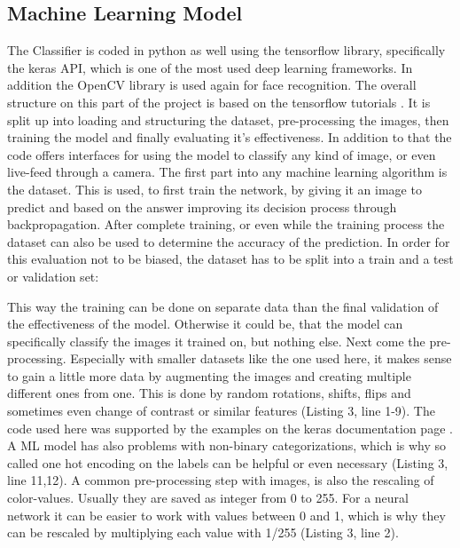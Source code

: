 \subsection{Machine Learning Model}

The Classifier is coded in python as well using the tensorflow library,
specifically the keras API, which is one of the most used deep learning
frameworks. In addition the OpenCV library is used again for face recognition. 
\newline
The overall structure on this part of the project is based on the tensorflow
tutorials \cite{tut}. It is split up into loading and structuring the dataset,
pre-processing the images, then training the model and finally evaluating it's
effectiveness. In addition to that the code offers interfaces for using the
model to classify any kind of image, or even live-feed through a camera.
\newline
The first part into any machine learning algorithm is the dataset. This is used,
to first train the network, by giving it an image to predict and based on the
answer improving its decision process through backpropagation. After complete
training, or even while the training process the dataset can also be used to
determine the accuracy of the prediction. In order for this evaluation not to be
biased, the dataset has to be split into a train and a test or validation set:

This way the training can be done on separate data than the final validation of
the effectiveness of the model. Otherwise it could be, that the model can
specifically classify the images it trained on, but nothing else.
\newline
Next come the pre-processing. Especially with smaller datasets like the one used
here, it makes sense to gain a little more data by augmenting the images and
creating multiple different ones from one. This is done by random rotations,
shifts, flips and sometimes even change of contrast or similar features (Listing
3, line 1-9). The code used here was supported by the examples on the keras
documentation page \cite{zoom_range=0.2}.
\newline
A ML model has also problems with non-binary categorizations, which is why so
called one hot encoding on the labels can be helpful or even necessary (Listing
3, line 11,12). 
\newline
A common pre-processing step with images, is also the rescaling of color-values.
Usually they are saved as integer from 0 to 255. For a neural network it can be
easier to work with values between 0 and 1, which is why they can be rescaled by
multiplying each value with 1/255 (Listing 3, line 2).

